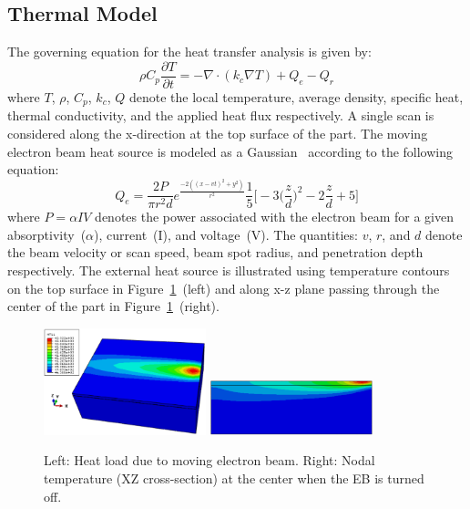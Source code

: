 \subsection{Thermal Model}
\label{sub:thermal}

The governing equation for the heat transfer analysis \cite{Zinoviev:2016} is given by:
\begin{equation}\label{eq_thermal}
\rho {C_p}\frac{{\partial T}}{{\partial t}} = -\nabla\cdot ({k_c}\nabla T) + Q_e - Q_r 
\end{equation}
where $T$, $\rho$, $C_p$, $k_c$, $Q$ denote the local temperature, average density, specific heat,  thermal conductivity, 
and the applied heat flux respectively. A single scan is considered along the x-direction at the top surface of the part. 
The moving electron beam heat source is modeled as a Gaussian~\cite{Vastola:2016} according to the following
equation:
%
\begin{equation}\label{eq_heatFlux}
Q_e = \frac{2P}{\pi r^2 d}e^{\frac{-2((x-vt)^2+y^2)}{r^2}}\frac{1}{5}\Big[-3\Big(\frac{z}{d}\Big)^2-2\frac{z}{d}+5\Big]
\end{equation}
%
where $P=\alpha IV$ denotes the power associated with the electron beam for a given absorptivity~($\alpha$),
current~(I), and voltage~(V). The quantities: $v$, $r$, and $d$ denote  the beam velocity or scan speed,
beam spot radius, and penetration depth respectively. The external heat source is illustrated using temperature
contours on the top surface in Figure~\ref{fig:thermal}~(left) and along x-z plane passing through the center of the part in
Figure~\ref{fig:thermal}~(right). 
%
\begin{figure}[htbp]
\begin{center}
\includegraphics[width=0.42\textwidth]{./Figures/NT11Nom3D} 
\includegraphics[width=0.42\textwidth]{./Figures/NT11Nom} 
\end{center}
\caption{Left: Heat load due to moving electron beam. Right: Nodal temperature (XZ cross-section) at the center when
the EB is turned off.}
\label{fig:thermal}
\end{figure}
%

